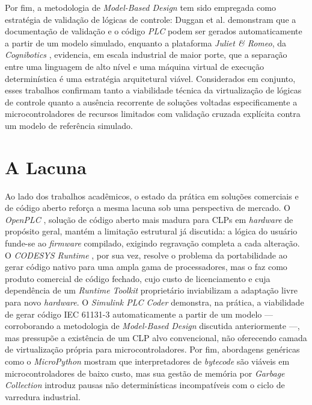 Por fim, a metodologia de \textit{Model-Based Design} tem sido empregada como estratégia de validação de lógicas de controle: Duggan et al. \cite{duggan:2022} demonstram que a documentação de validação e o código \textit{PLC} podem ser gerados automaticamente a partir de um modelo simulado, enquanto a plataforma \textit{Juliet \& Romeo}, da \textit{Cognibotics} \cite{cognibotics:2025}, evidencia, em escala industrial de maior porte, que a separação entre uma linguagem de alto nível e uma máquina virtual de execução determinística é uma estratégia arquitetural viável.
Considerados em conjunto, esses trabalhos confirmam tanto a viabilidade técnica da virtualização de lógicas de controle quanto a ausência recorrente de soluções voltadas especificamente a microcontroladores de recursos limitados com validação cruzada explícita contra um modelo de referência simulado.


\section{A Lacuna}
\label{sec:lacuna}

Ao lado dos trabalhos acadêmicos, o estado da prática em soluções comerciais e de código aberto reforça a mesma lacuna sob uma perspectiva de mercado.
O \textit{OpenPLC} \cite{openplc:2025}, solução de código aberto mais madura para CLPs em \textit{hardware} de propósito geral, mantém a limitação estrutural já discutida: a lógica do usuário funde-se ao \textit{firmware} compilado, exigindo regravação completa a cada alteração.
O \textit{CODESYS Runtime} \cite{codesys:2025}, por sua vez, resolve o problema da portabilidade ao gerar código nativo para uma ampla gama de processadores, mas o faz como produto comercial de código fechado, cujo custo de licenciamento e cuja dependência de um \textit{Runtime Toolkit} proprietário inviabilizam a adaptação livre para novo \textit{hardware}.
O \textit{Simulink PLC Coder} \cite{mathworks:2025} demonstra, na prática, a viabilidade de gerar código IEC 61131-3 automaticamente a partir de um modelo --- corroborando a metodologia de \textit{Model-Based Design} discutida anteriormente ---, mas pressupõe a existência de um CLP alvo convencional, não oferecendo camada de virtualização própria para microcontroladores.
Por fim, abordagens genéricas como o \textit{MicroPython} \cite{micropython:2025} mostram que interpretadores de \textit{bytecode} são viáveis em microcontroladores de baixo custo, mas sua gestão de memória por \textit{Garbage Collection} introduz pausas não determinísticas incompatíveis com o ciclo de varredura industrial.

